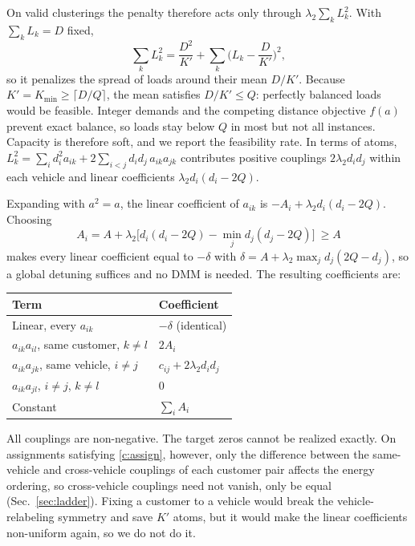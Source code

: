 \documentclass[10pt]{article}
\begin{document}
On valid clusterings the penalty therefore acts only through $\lambda_2\sum_kL_k^2$. With $\sum_kL_k=D$ fixed,
\begin{equation}
  \sum_k L_k^2=\frac{D^2}{K'}+\sum_k\Big(L_k-\frac{D}{K'}\Big)^2 ,
\end{equation}
so it penalizes the spread of loads around their mean $D/K'$. Because $K'=K_{\min}\ge\lceil D/Q\rceil$,
the mean satisfies $D/K'\le Q$: perfectly balanced loads would be feasible. Integer demands and the
competing distance objective $f(a)$ prevent exact balance, so loads stay below $Q$ in most but not all
instances. Capacity is therefore soft, and we report the feasibility rate. In terms of atoms,
$L_k^2=\sum_i d_i^2a_{ik}+2\sum_{i<j}d_id_j\,a_{ik}a_{jk}$ contributes positive couplings $2\lambda_2 d_id_j$
within each vehicle and linear coefficients $\lambda_2 d_i(d_i-2Q)$.

Expanding with $a^2=a$, the linear coefficient of $a_{ik}$ is $-A_i+\lambda_2 d_i(d_i-2Q)$. Choosing
\begin{equation}
  A_i=A+\lambda_2\Big[d_i(d_i-2Q)-\min_j d_j(d_j-2Q)\Big]\ \ge A
\end{equation}
makes every linear coefficient equal to $-\delta$ with $\delta=A+\lambda_2\max_j d_j(2Q-d_j)$, so a global
detuning suffices and no DMM is needed. The resulting coefficients are:
\begin{center}
\begin{tabular}{@{}ll@{}}
\toprule
Term & Coefficient \\
\midrule
Linear, every $a_{ik}$ & $-\delta$ (identical) \\
$a_{ik}a_{il}$, same customer, $k\ne l$ & $2A_i$ \\
$a_{ik}a_{jk}$, same vehicle, $i\ne j$ & $c_{ij}+2\lambda_2 d_id_j$ \\
$a_{ik}a_{jl}$, $i\ne j$, $k\ne l$ & $0$ \\
Constant & $\sum_i A_i$ \\
\bottomrule
\end{tabular}
\end{center}
All couplings are non-negative. The target zeros cannot be realized exactly. On assignments satisfying
\eqref{c:assign}, however, only the difference between the same-vehicle and cross-vehicle couplings of each customer
pair affects the energy ordering, so cross-vehicle couplings need not vanish, only be equal (Sec.~\ref{sec:ladder}). Fixing a customer to a vehicle would break the vehicle-relabeling symmetry and save $K'$ atoms, but it would make the linear coefficients non-uniform again, so we do not do it.
\end{document}

